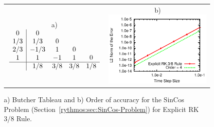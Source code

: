 \begin{figure}[H]
\centering{}%
\begin{tabular}{cc}
a)$\begin{array}{c|cccc}
0 & 0\\
1/3 & 1/3 & 0\\
2/3 & -1/3 & 1 & 0\\
1 & 1 & -1 & 1 & 0\\
\hline  & 1/8 & 3/8 & 3/8 & 1/8
\end{array}$ & b)\includegraphics[scale=1.5]{figures/ERK_3_8_Rule}\tabularnewline
\end{tabular}\caption{a) Butcher Tableau and b) Order of accuracy for the SinCos Problem
(Section~\ref{rythmos:sec:SinCos-Problem}) for Explicit RK 3/8 Rule.\label{rythmos:tab:ButcherTableau-ERK_3_8_Rule}}
\end{figure}

